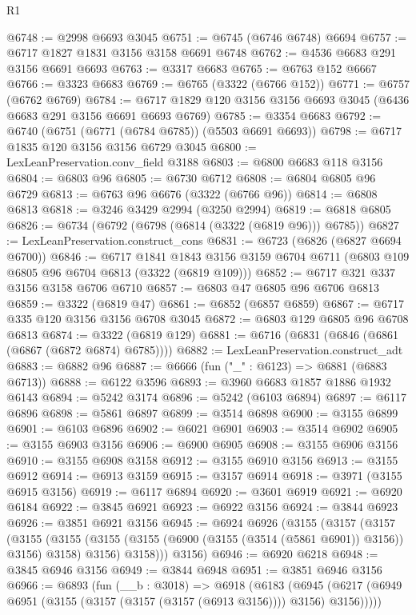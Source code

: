 \begin{lexlean}{R1}
\begin{coremodule}
@6748 := @2998 @6693 @3045
@6751 := @6745 (@6746 @6748) @6694
@6757 := @6717 @1827 @1831 @3156 @3158 @6691 @6748
@6762 := @4536 @6683 @291 @3156 @6691 @6693
@6763 := @3317 @6683
@6765 := @6763 @152 @6667
@6766 := @3323 @6683
@6769 := @6765 (@3322 (@6766 @152))
@6771 := @6757 (@6762 @6769)
@6784 := @6717 @1829 @120 @3156 @3156 @6693 @3045 (@6436 @6683 @291 @3156 @6691 @6693 @6769)
@6785 := @3354 @6683
@6792 := @6740 (@6751 (@6771 (@6784 @6785)) (@5503 @6691 @6693))
@6798 := @6717 @1835 @120 @3156 @3156 @6729 @3045
@6800 := LexLeanPreservation.conv_field @3188
@6803 := @6800 @6683 @118 @3156
@6804 := @6803 @96
@6805 := @6730 @6712
@6808 := @6804 @6805 @96 @6729
@6813 := @6763 @96 @6676 (@3322 (@6766 @96))
@6814 := @6808 @6813
@6818 := @3246 @3429 @2994 (@3250 @2994)
@6819 := @6818 @6805
@6826 := @6734 (@6792 (@6798 (@6814 (@3322 (@6819 @96))) @6785))
@6827 := LexLeanPreservation.construct_cons
@6831 := @6723 (@6826 (@6827 @6694 @6700))
@6846 := @6717
    @1841
    @1843
    @3156
    @3159
    @6704
    @6711
    (@6803 @109 @6805 @96 @6704 @6813 (@3322 (@6819 @109)))
@6852 := @6717 @321 @337 @3156 @3158 @6706 @6710
@6857 := @6803 @47 @6805 @96 @6706 @6813
@6859 := @3322 (@6819 @47)
@6861 := @6852 (@6857 @6859)
@6867 := @6717 @335 @120 @3156 @3156 @6708 @3045
@6872 := @6803 @129 @6805 @96 @6708 @6813
@6874 := @3322 (@6819 @129)
@6881 := @6716 (@6831 (@6846 (@6861 (@6867 (@6872 @6874) @6785))))
@6882 := LexLeanPreservation.construct_adt
@6883 := @6882 @96
@6887 := @6666 (fun ("_" : @6123) => @6881 (@6883 @6713))
@6888 := @6122 @3596
@6893 := @3960 @6683 @1857 @1886 @1932 @6143
@6894 := @5242 @3174
@6896 := @5242 (@6103 @6894)
@6897 := @6117 @6896
@6898 := @5861 @6897
@6899 := @3514 @6898
@6900 := @3155 @6899
@6901 := @6103 @6896
@6902 := @6021 @6901
@6903 := @3514 @6902
@6905 := @3155 @6903 @3156
@6906 := @6900 @6905
@6908 := @3155 @6906 @3156
@6910 := @3155 @6908 @3158
@6912 := @3155 @6910 @3156
@6913 := @3155 @6912
@6914 := @6913 @3159
@6915 := @3157 @6914
@6918 := @3971 (@3155 @6915 @3156)
@6919 := @6117 @6894
@6920 := @3601 @6919
@6921 := @6920 @6184
@6922 := @3845 @6921
@6923 := @6922 @3156
@6924 := @3844 @6923
@6926 := @3851 @6921 @3156
@6945 := @6924
    @6926
    (@3155
      (@3157
        (@3157
          (@3155
            (@3155 (@3155 (@3155 (@6900 (@3155 (@3514 (@5861 @6901)) @3156)) @3156) @3158) @3156)
            @3158)))
      @3156)
@6946 := @6920 @6218
@6948 := @3845 @6946 @3156
@6949 := @3844 @6948
@6951 := @3851 @6946 @3156
@6966 := @6893
    (fun (__b : @3018) =>
    @6918
      (@6183
        (@6945 (@6217 (@6949 @6951 (@3155 (@3157 (@3157 (@3157 (@6913 @3156)))) @3156) @3156)))))

\end{coremodule}
\end{lexlean}
